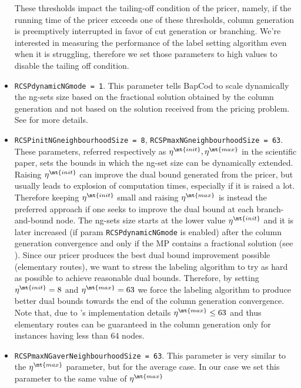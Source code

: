 \begin{itemize}
	      These thresholds impact the tailing-off condition of the pricer, namely, if the running time of the pricer exceeds one of these thresholds, column generation is preemptively interrupted in favor of cut generation or branching.
	      We're interested in measuring the performance of the label setting algorithm even when it is struggling, therefore we set those parameters to high values to disable the tailing off condition.
	\item \texttt{RCSPdynamicNGmode = 1}.
	      This parameter tells BapCod to scale dynamically
	      the ng-sets size based on the
	      fractional solution obtained by the column generation
	      and not based on the solution received from the pricing problem.
	      See \textcite{pessoa2020generic} for more details.
	\item \texttt{RCSPinitNGneighbourhoodSize = 8}, \texttt{RCSPmaxNGneighbourhoodSize = 63}.
	      These parameters, referred respectively as $\eta^\mt{init}, \eta^\mt{max}$ in the scientific paper,
	      sets the bounds in which the ng-set size can be dynamically extended.
	      Raising $\eta^\mt{init}$ can improve the dual bound generated from the pricer, but usually leads to explosion of computation times, especially if it is raised a lot.
	      Therefore keeping $\eta^\mt{init}$ small and raising $\eta^\mt{max}$ is instead the preferred approach if one seeks to improve the dual bound at each branch-and-bound node.
	      The ng-sets size starts at the lower value $\eta^\mt{init}$ and it is later increased (if param \texttt{RCSPdynamicNGmode} is enabled)
	      after the column generation convergence and only if the MP contains a fractional solution (see \cite{pessoa2020generic}).
	      Since our pricer produces the best dual bound improvement possible (elementary routes),
	      we want to stress the labeling algorithm to try as hard as possible to achieve
	      reasonable dual bounds.
	      Therefore, by setting $\eta^\mt{init} = 8$ and $\eta^\mt{max} = 63$
	      we force the labeling algorithm to produce better dual bounds towards the end of the column generation convergence.
	      Note that, due to \bapcod's implementation details $\eta^\mt{max} \le 63$ and thus
	      elementary routes can be guaranteed in the column generation
	      only for instances having less than $64$ nodes.
	\item \texttt{RCSPmaxNGaverNeighbourhoodSize = 63}.
	      This parameter is very similar to the $\eta^\mt{max}$ parameter, but for the average case.
	      In our case we set this parameter to the same value of $\eta^\mt{max}$

\end{itemize}

